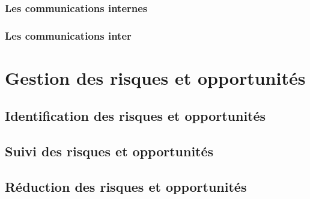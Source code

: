 \subsubsection*{Les communications internes}
\subsubsection*{Les communications inter\picCourt{}}  

\section{Gestion des risques et opportunités} 

\subsection{Identification des risques et opportunités}
\subsection{Suivi des risques et opportunités}
\subsection{Réduction des risques et opportunités}

